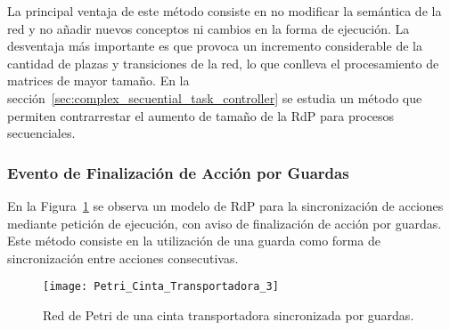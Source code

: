 La principal ventaja de este método consiste en no modificar la semántica de
la red y no añadir nuevos conceptos ni cambios en la forma de ejecución.
La desventaja más importante es que provoca un incremento considerable de
la cantidad de plazas y transiciones de la red, lo que conlleva el
procesamiento de matrices de mayor tamaño. En la
sección~\ref{sec:complex_secuential_task_controller} se estudia un método que
permiten contrarrestar el aumento de tamaño de la RdP para procesos
secuenciales.

\subsubsection{Evento de Finalización de Acción por Guardas}
En la Figura~\ref{fig:petri_cinta_transportadora_3} se observa un modelo de
RdP para la sincronización de acciones mediante petición de ejecución, con aviso
de finalización de acción por guardas. Este método consiste en la utilización de
una guarda como forma de sincronización entre acciones consecutivas.

\begin{figure}[H]
    \centering
    \texttt{[image: Petri\_Cinta\_Transportadora\_3]}
    \caption{Red de Petri de una cinta transportadora sincronizada por guardas.}
    \label{fig:petri_cinta_transportadora_3}
\end{figure}

